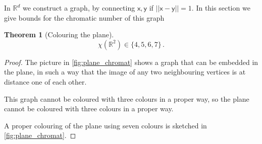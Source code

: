 \documentclass[12pt]{amsart}
\theoremstyle{definition}
\newtheorem{thm}{Theorem}[section]
\newcommand{\R}{\mathbb{R}}
\newcommand{\vx}{\mathsf{x}}
\newcommand{\vy}{\mathsf{y}}
\begin{document}
In $\R^d$ we construct a graph, by connecting $\vx, \vy$ if $||\vx - \vy|| = 1$.
In this section we give bounds for the chromatic number of this graph

\begin{thm}[Colouring the plane]
$$\chi (\R^2) \in \{4, 5, 6, 7\}\, .$$
\end{thm}

\begin{proof}
The picture in \cref{fig:plane_chromat} shows a graph that can be embedded in the plane, in such a way that the image of any two neighbouring vertices is at distance one of each other.

This graph cannot be coloured with three colours in a proper way, so the plane cannot be coloured with three colours in a proper way.

A proper colouring of the plane using seven colours is sketched in \cref{fig:plane_chromat}.



\end{proof}
\end{document}
